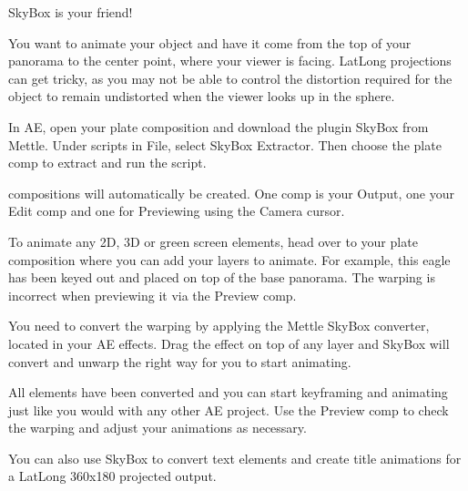 \begin{fullwidth}
\clearpage
{\large SkyBox is your friend! \par}

You want to animate your object and have it come from the top of your panorama to the center point, where your viewer is facing. LatLong projections can get tricky, as you may not be able to control the distortion required for the object to remain undistorted when the viewer looks up in the sphere.

In AE, open your plate composition and download the plugin SkyBox from Mettle. Under scripts in File, select SkyBox Extractor. Then choose the plate comp to extract and run the script.

 compositions will automatically be created. One comp is your Output, one your Edit comp and one for Previewing using the Camera cursor.


To animate any 2D, 3D or green screen elements, head over to your plate composition where you can add your layers to animate. For example, this eagle has been keyed out and placed on top of the base panorama. The warping is incorrect when previewing it via the Preview comp. 


You need to convert the warping by applying the Mettle SkyBox converter, located in your AE effects. Drag the effect on top of any layer and SkyBox will convert and unwarp the right way for you to start animating. 


All elements have been converted and you can start keyframing and animating just like you would with any other AE project. Use the Preview comp to check the warping and adjust your animations as necessary. 


You can also use SkyBox to convert text elements and create title animations for a LatLong 360x180 projected output.


\clearpage
\end{fullwidth}